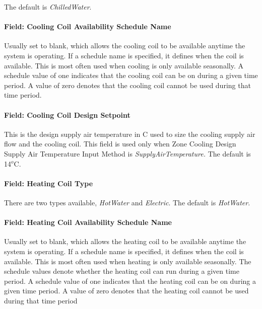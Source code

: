 The default is \emph{ChilledWater}.

\paragraph{Field: Cooling Coil Availability Schedule Name}\label{field-cooling-coil-availability-schedule-name}

Usually set to blank, which allows the cooling coil to be available anytime the system is operating. If a schedule name is specified, it defines when the coil is available. This is most often used when cooling is only available seasonally. A schedule value of one indicates that the cooling coil can be on during a given time period. A value of zero denotes that the cooling coil cannot be used during that time period.

\paragraph{Field: Cooling Coil Design Setpoint}\label{field-cooling-coil-design-setpoint}

This is the design supply air temperature in C used to size the cooling supply air flow and the cooling coil. This field is used only when Zone Cooling Design Supply Air Temperature Input Method is \emph{SupplyAirTemperature.} The default is 14\(^{o}\)C.

\paragraph{Field: Heating Coil Type}\label{field-heating-coil-type}

There are two types available, \emph{HotWater} and \emph{Electric}. The default is \emph{HotWater}.

\paragraph{Field: Heating Coil Availability Schedule Name}\label{field-heating-coil-availability-schedule-name}

Usually set to blank, which allows the heating coil to be available anytime the system is operating. If a schedule name is specified, it defines when the coil is available. This is most often used when heating is only available seasonally. The schedule values denote whether the heating coil can run during a given time period. A schedule value of one indicates that the heating coil can be on during a given time period. A value of zero denotes that the heating coil cannot be used during that time period

